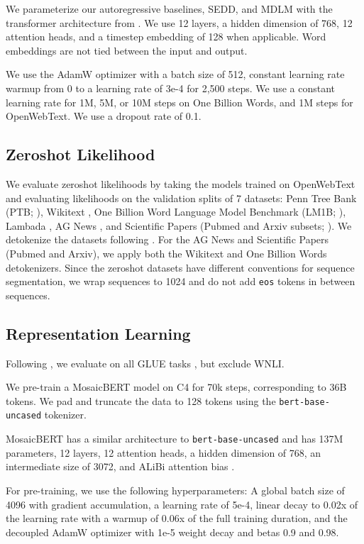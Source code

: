 \documentclass{article} %
\begin{document}
{\begin{appendices}
We parameterize our autoregressive baselines, SEDD, and MDLM with the transformer architecture from \citet{lou2023discrete}. We use 12 layers, a hidden dimension of 768, 12 attention heads, and a timestep embedding of 128 when applicable. Word embeddings are not tied between the input and output.

We use the AdamW optimizer with a batch size of 512, constant learning rate warmup from 0 to a learning rate of 3e-4 for 2,500 steps. We use a constant learning rate for 1M, 5M, or 10M steps on One Billion Words, and 1M steps for OpenWebText. We use a dropout rate of 0.1.

\subsection{Zeroshot Likelihood}
We evaluate zeroshot likelihoods by taking the models trained on OpenWebText and evaluating likelihoods on the validation splits of 7 datasets: Penn Tree Bank (PTB; \citet{marcus1993building}), Wikitext \citep{merity2016pointer}, One Billion Word Language Model Benchmark (LM1B; \citet{chelba2014billion}), Lambada \citep{paperno-EtAl:2016:P16-1}, AG News \citep{Zhang2015CharacterlevelCN}, and Scientific Papers (Pubmed and Arxiv subsets; \citet{Cohan_2018}).
We detokenize the datasets following \citet{lou2023discrete}.
For the AG News and Scientific Papers (Pubmed and Arxiv), we apply both the Wikitext and One Billion Words detokenizers.
Since the zeroshot datasets have different conventions for sequence segmentation, we wrap sequences to 1024 and do not add \texttt{eos} tokens in between sequences.

\subsection{Representation Learning}
\label{appendix:hyperparameters:rep}
Following \citet{devlin2018bert}, we evaluate on all GLUE tasks \citep{wang2018glue}, but exclude WNLI.

We pre-train a MosaicBERT model on C4 \citep{t5} for 70k steps, corresponding to 36B tokens. We pad and truncate the data to 128 tokens using the \texttt{bert-base-uncased} tokenizer.

MosaicBERT \citep{portes2024mosaicbert} has a similar architecture to \texttt{bert-base-uncased} and has 137M parameters, 12 layers, 12 attention heads, a hidden dimension of 768, an intermediate size of 3072, and ALiBi attention bias \citep{press}.

For pre-training, we use the following hyperparameters: A global batch size of 4096 with gradient accumulation, a learning rate of 5e-4, linear decay to 0.02x of the learning rate with a warmup of 0.06x of the full training duration, and the decoupled AdamW optimizer with 1e-5 weight decay and betas 0.9 and 0.98.


\end{appendices}}
\end{document}
